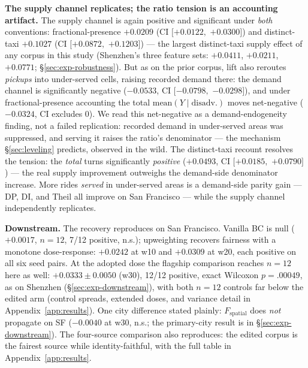 \textbf{The supply channel replicates; the ratio tension is an accounting
artifact.} The supply channel is again positive
and
significant under \emph{both} conventions: frac\-tional-pres\-ence
$+0.0209$ (CI $[+0.0122,$ $+0.0300]$) and dis\-tinct-taxi $+0.1027$
(CI $[+0.0872,$ $+0.1203]$) --- the largest distinct-taxi supply effect of
any corpus in this study (Shenzhen's three feature sets: $+0.0411$,
$+0.0211$, $+0.0771$; \S\ref{sec:exp-robustness}). But as on the prior
corpus, lift also reroutes \emph{pickups} into under-served cells, raising
recorded demand there: the demand channel is significantly negative
($-0.0533$, CI $[-0.0798,$ $-0.0298]$), and under frac\-tional-pres\-ence
accounting the
total $\mathrm{mean}(Y \mid \mathrm{disadv.})$ moves net-negative
($-0.0324$, CI excludes 0). We read this net-negative as a
demand-endogeneity finding, not a failed replication: recorded demand in
under-served areas was suppressed, and serving it raises the ratio's
denominator --- the mechanism \S\ref{sec:leveling} predicts, observed in
the wild. The distinct-taxi recount resolves the tension: the \emph{total}
turns
significantly \emph{positive} ($+0.0493$, CI $[+0.0185,$ $+0.0790]$) ---
the real supply improvement outweighs the demand-side denominator increase.
More rides \emph{served} in under-served areas is a demand-side parity gain
--- DP, DI, and Theil all improve on San Francisco --- while the supply
channel independently replicates.

\textbf{Downstream.} The recovery reproduces on San Francisco. Van\-illa BC is
null ($+0.0017$, $n = 12$, 7/12 positive, n.s.); upweighting recovers
fairness with a monotone dose-response: $+0.0242$ at w10 and $+0.0309$
at w20, each positive on all six seed pairs. At the
adopted dose the flagship comparison reaches $n = 12$ here as well:
$+0.0333 \pm 0.0050$ (w30), 12/12 positive, exact Wilcoxon $p = .00049$,
as on Shenzhen (\S\ref{sec:exp-downstream}), with both $n = 12$ controls
far below the edited arm (control spreads, extended doses, and variance
detail in Appendix~\ref{app:results}).
One city difference stated plainly:
$F_{\mathrm{spatial}}$ does \emph{not} propagate on SF ($-0.0040$ at w30,
n.s.; the primary-city result is in \S\ref{sec:exp-downstream}).
The four-source comparison also reproduces: the edited corpus is the fairest
source while identity-faithful, with the full table in
Appendix~\ref{app:results}.

